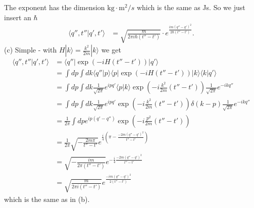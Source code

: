 \documentclass[../main.tex]{subfiles}
\begin{document}
The exponent has the dimension $\text{kg}\cdot\text{m}^2/s$ which is the same as Js. So we just insert an $\hbar$
\begin{align}
\langle q'',t''|q',t'\rangle
&=\sqrt{\frac{m}{2\pi i\hbar(t''-t')}}\cdot e^{\frac{im(q''-q')^2}{2\hbar(t''-t')}}.
\end{align}
(c) Simple - with $H|k\rangle=\frac{k^2}{2m}|k\rangle$ we get
\begin{align}
\langle q'',t''|q',t'\rangle
&=\langle q''|\exp(-iH(t''-t'))|q'\rangle\\
&=\int dp\int dk\langle q''|p\rangle\langle p|\exp(-iH(t''-t'))|k\rangle\langle k|q'\rangle\\
&=\int dp\int dk\frac{1}{\sqrt{2\pi}}e^{ipq'}\langle p|k\rangle\exp(-i\frac{k^2}{2m}(t''-t'))\frac{1}{\sqrt{2\pi}}e^{-ikq''}\\
&=\int dp\int dk\frac{1}{\sqrt{2\pi}}e^{ipq'}\exp(-i\frac{k^2}{2m}(t''-t'))\delta(k-p)\frac{1}{\sqrt{2\pi}}e^{-ikq''}\\
&=\frac{1}{2\pi}\int dpe^{ip(q'-q'')}\exp(-i\frac{p^2}{2m}(t''-t'))\\
&=\frac{1}{2\pi}\sqrt{-\frac{2m\pi}{t''-t'}}e^{\frac{i}{4}\left(\pi-\frac{-2m(q''-q')^2}{t''-t'}\right)}\\
&=\sqrt{-\frac{im}{2\pi(t''-t')}}e^{-\frac{i}{4}\frac{-2m(q''-q')^2}{t''-t'}}\\
&=\sqrt{\frac{m}{2\pi i(t''-t')}}e^{\frac{-im(q''-q')^2}{2(t''-t')}}
\end{align}
which is the same as in (b).
\end{document}
